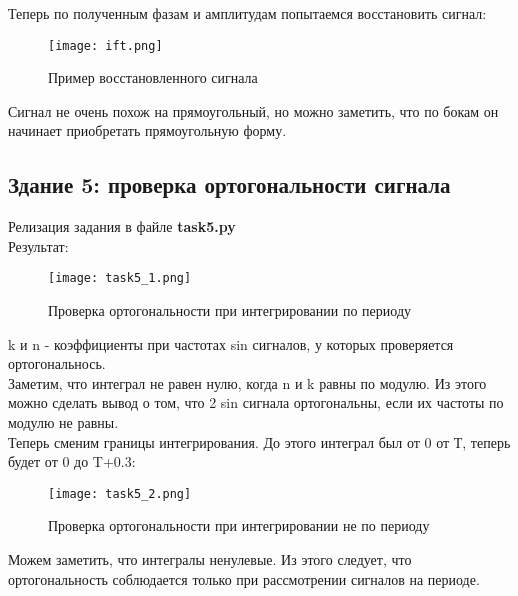 Теперь по полученным фазам и амплитудам попытаемся восстановить сигнал:

\begin{figure}[H]
    \centering
    \texttt{[image: ift.png]}
    \caption{Пример восстановленного сигнала}
\end{figure}

Сигнал не очень похож на прямоугольный, но можно заметить, что по бокам он начинает приобретать прямоугольную форму.

\subsection*{\textbf{Здание 5: проверка ортогональности сигнала}}

Релизация задания в файле \textbf{task5.py} \\

Результат: \\

\begin{figure}[H]
    \centering
    \texttt{[image: task5\_1.png]}
    \caption{Проверка ортогональности при интегрировании по периоду}
\end{figure}

k и n - коэффициенты при частотах sin сигналов, у которых проверяется ортогональнось. \\

Заметим, что интеграл не равен нулю, когда n и k равны по модулю. Из этого можно сделать вывод о том, что 2 sin сигнала
ортогональны, если их частоты по модулю не равны. \\

Теперь сменим границы интегрирования. До этого интеграл был от 0 от Т, теперь будет от 0 до T+0.3:

\begin{figure}[H]
    \centering
    \texttt{[image: task5\_2.png]}
    \caption{Проверка ортогональности при интегрировании не по периоду}
\end{figure}

Можем заметить, что интегралы ненулевые. Из этого следует, что ортогональность соблюдается только при рассмотрении сигналов
на периоде.



\endinput